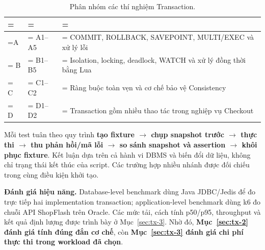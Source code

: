 \begin{table}[H]
\centering
\caption{Phân nhóm các thí nghiệm Transaction.}\label{tab:tx-2}
\reporttablesetup
\footnotesize
\begin{tabularx}{\linewidth}{|>{\hsize\linewidth=\hsize}L|>{\hsize\linewidth=\hsize}L|>{\hsize\linewidth=\hsize}L|}
\hline
{}
 &  &  \\ \hline
A & A1–A5 & COMMIT, ROLLBACK, SAVEPOINT, MULTI/EXEC và xử lý lỗi \\ \hline
B & B1–B5 & Isolation, locking, deadlock, WATCH và xử lý đồng thời bằng Lua \\ \hline
C & C1–C2 & Ràng buộc toàn vẹn và cơ chế bảo vệ Consistency \\ \hline
D & D1–D2 & Transaction gồm nhiều thao tác trong nghiệp vụ Checkout \\ \hline
\end{tabularx}
\end{table}
Mỗi test tuân theo quy trình \textbf{tạo fixture \(\rightarrow\) chụp snapshot trước \(\rightarrow\) thực thi \(\rightarrow\) thu phản hồi/mã lỗi \(\rightarrow\) so sánh snapshot và assertion \(\rightarrow\) khôi phục fixture}. Kết luận dựa trên cả hành vi DBMS và biến đổi dữ liệu, không chỉ trạng thái kết thúc của script. Các trường hợp nhiều nhánh được đối chiếu trong cùng điều kiện khởi tạo.

\textbf{Đánh giá hiệu năng.} Database-level benchmark dùng Java JDBC/Jedis để đo trực tiếp hai implementation transaction; application-level benchmark dùng k6 đo chuỗi API ShopFlash trên Oracle. Các mức tải, cách tính p50/p95, throughput và kết quả định lượng được trình bày ở Mục~\ref{sec:tx-3}. Nhờ đó, \textbf{Mục~\ref{sec:tx-2} đánh giá tính đúng đắn cơ chế}, còn \textbf{Mục~\ref{sec:tx-3} đánh giá chi phí thực thi trong workload đã chọn}.
